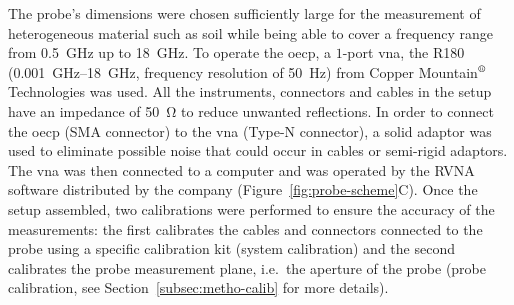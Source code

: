 The probe's dimensions were chosen sufficiently large for the measurement of heterogeneous material such as soil while being able to cover a frequency range from \SI{0.5}{\giga\hertz} up to \SI{18}{\giga\hertz}.
To operate the \ac{oecp}, a \(1\)-port \acf{vna}, the R180 (\SIrange{0.001}{18}{\giga\hertz}, frequency resolution of \qty{50}{\hertz}) from Copper Mountain\(^\text{\textregistered}\) Technologies was used.
All the instruments, connectors and cables in the setup have an impedance of \SI{50}{\ohm} to reduce unwanted reflections.
In order to connect the \ac{oecp} (SMA connector) to the \ac{vna} (Type-N connector), a solid adaptor was used to eliminate possible noise that could occur in cables or semi-rigid adaptors.
The \ac{vna} was then connected to a computer and was operated by the RVNA software distributed by the company (Figure~\ref{fig:probe-scheme}C).
Once the setup assembled, two calibrations were performed to ensure the accuracy of the measurements: the first calibrates the cables and connectors connected to the probe using a specific calibration kit (system calibration) and the second calibrates the probe measurement plane, i.e.\ the aperture of the probe (probe calibration, see Section~\ref{subsec:metho-calib} for more details).

